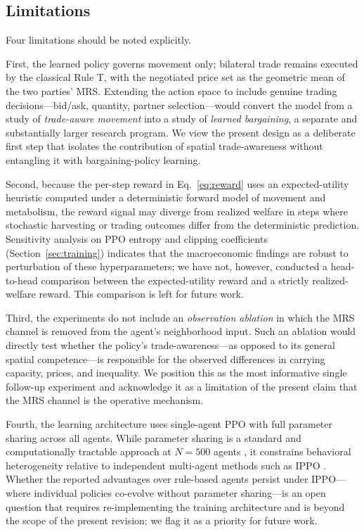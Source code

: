 \documentclass[pdflatex,sn-mathphys-num]{sn-jnl}%
\theoremstyle{thmstyleone}%
\theoremstyle{thmstyletwo}%
\theoremstyle{thmstylethree}%
\begin{document}
\subsection{Limitations}
\label{sec:limitations}

Four limitations should be noted explicitly.

First, the learned policy governs movement only; bilateral trade remains executed by the classical Rule T, with the negotiated price set as the geometric mean of the two parties' MRS.  
Extending the action space to include genuine trading decisions---bid/ask, quantity, partner selection---would convert the model from a study of \emph{trade-aware movement} into a study of \emph{learned bargaining}, a separate and substantially larger research program.  
We view the present design as a deliberate first step that isolates the contribution of spatial trade-awareness without entangling it with bargaining-policy learning.

Second, because the per-step reward in Eq.~\eqref{eq:reward} uses an expected-utility heuristic computed under a deterministic forward model of movement and metabolism, the reward signal may diverge from realized welfare in steps where stochastic harvesting or trading outcomes differ from the deterministic prediction.  
Sensitivity analysis on PPO entropy and clipping coefficients (Section~\ref{sec:training}) indicates that the macroeconomic findings are robust to perturbation of these hyperparameters; we have not, however, conducted a head-to-head comparison between the expected-utility reward and a strictly realized-welfare reward.  
This comparison is left for future work.

Third, the experiments do not include an \emph{observation ablation} in which the MRS channel is removed from the agent's neighborhood input.
Such an ablation would directly test whether the policy's trade-awareness---as opposed to its general spatial competence---is responsible for the observed differences in carrying capacity, prices, and inequality.
We position this as the most informative single follow-up experiment and acknowledge it as a limitation of the present claim that the MRS channel is the operative mechanism.

Fourth, the learning architecture uses single-agent PPO with full parameter sharing across all agents.
While parameter sharing is a standard and computationally tractable approach at $N = 500$ agents \citep{Yu2022}, it constrains behavioral heterogeneity relative to independent multi-agent methods such as IPPO \citep{deWitt2020}.
Whether the reported advantages over rule-based agents persist under IPPO---where individual policies co-evolve without parameter sharing---is an open question that requires re-implementing the training architecture and is beyond the scope of the present revision; we flag it as a priority for future work.
\end{document}
